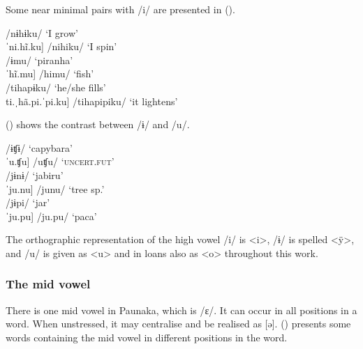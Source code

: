 Some near minimal pairs with /i/ are presented in ().

  \ea\label{ex:ÿ-i}
\ea     \tab[nɨ.ˈhɨ̃.ku] \tab\tab /nɨhɨku/ \tab ‘I grow’\\
     \tab{[}ˈni.hĩ.ku] \tab\tab /nihiku/ \tab ‘I spin’\\
\ex  \tab[ˈɨ.mu] \tab\tab /ɨmu/ \tab\tab ‘piranha’\\
    \tab{[}ˈhĩ.mu] \tab\tab /himu/ \tab ‘fish’\\
\ex     \tab[ti.ˈhã.pɨ.ku] \tab\tab /tihapɨku/ \tab ‘he/she fills’\\
     \tab{[}ti.ˌhã.pi.ˈpi.ku] \tab /tihapipiku/ \tab ‘it lightens’\\%
\z
\xe

() shows the contrast between /ɨ/ and /u/.


  \ea\label{ex:ÿ-u}
\ea     \tab[ˈɨ.ʧɨ] \tab\tab /ɨʧɨ/ \tab\tab ‘capybara’\\
     \tab{[}ˈu.ʧu] \tab /uʧu/ \tab\tab ‘\textsc{uncert.fut}’\\
\ex     \tab[ˈjɨ.nɨ] \tab /jɨnɨ/ \tab\tab ‘jabiru’\\
     \tab{[}ˈju.nu] \tab /junu/ \tab ‘tree sp.’\\
\ex      \tab[ˈjɨ.pi] \tab /jɨpi/ \tab\tab ‘jar’\\
    \tab{[}ˈju.pu] \tab /ju.pu/ \tab ‘paca’\\%
\z
\xe

The orthographic representation of the high vowel /i/ is <i>, /ɨ/ is spelled <ÿ>, and /u/ is given as <u> and in loans also as <o> throughout this work.
    
\subsubsection{The mid vowel} \label{paragraph:MidVowel}

There is one mid vowel in Paunaka, which is /ɛ/. It can occur in all positions in a word. When unstressed, it may centralise and be realised as [ə]. () presents some words containing the mid vowel in different positions in the word.

